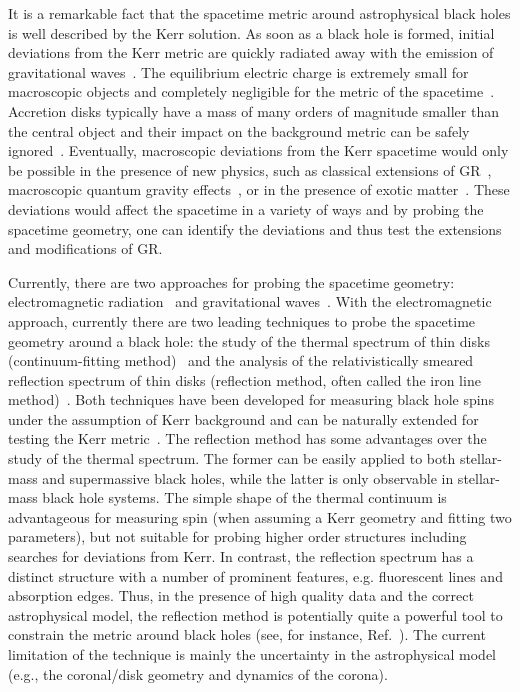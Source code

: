 \documentclass[11pt,a4paper,pdftex]{article}
\begin{document}
It is a remarkable fact that the spacetime metric around astrophysical black holes is well described by the Kerr solution. As soon as a black hole is formed, initial deviations from the Kerr metric are quickly radiated away with the emission of gravitational waves~\cite{price1,price2}. The equilibrium electric charge is extremely small for macroscopic objects and completely negligible for the metric of the spacetime~\cite{bambi2009black}. Accretion disks typically have a mass of many orders of magnitude smaller than the central object and their impact on the background metric can be safely ignored~\cite{barausse2014can,naokidisk}. Eventually, macroscopic deviations from the Kerr spacetime would only be possible in the presence of new physics, such as classical extensions of GR~\cite{extentions_GR}, macroscopic quantum gravity effects~\cite{dvali2013_quantum_effects2,dvali2013_quantum_effects1,giddings2014_quantum_effects}, or in the presence of exotic matter~\cite{herdeiro2015_exotic_field,herdeiro2016_exotic_field}. These deviations would affect the spacetime in a variety of ways and by probing the spacetime geometry, one can identify the deviations and thus test the extensions and modifications of GR.


Currently, there are two approaches for probing the spacetime geometry: electromagnetic radiation~\cite{em1,em2,em3} and gravitational waves~\cite{gw1,gw2}. With the electromagnetic approach, currently there are two leading techniques to probe the spacetime geometry around a black hole: the study of the thermal spectrum of thin disks (continuum-fitting method)~\cite{cfm1,cfm2,cfm3} and the analysis of the relativistically smeared reflection spectrum of thin disks (reflection method, often called the iron line method)~\cite{i1,i2,i3}. Both techniques have been developed for measuring black hole spins under the assumption of Kerr background and can be naturally extended for testing the Kerr metric~\cite{t1,t2,t3,t4,t5,t6,t7,t8}. The reflection method has some advantages over the study of the thermal spectrum. The former can be easily applied to both stellar-mass and supermassive black holes, while the latter is only observable in stellar-mass black hole systems. The simple shape of the thermal continuum is advantageous for measuring spin (when assuming a Kerr geometry and fitting two parameters), but not suitable for probing higher order structures including searches for deviations from Kerr. In contrast, the reflection spectrum has a distinct structure with a number of prominent features, e.g. fluorescent lines and absorption edges. Thus, in the presence of high quality data and the correct astrophysical model, the reflection method is potentially quite a powerful tool to constrain the metric around black holes (see, for instance, Ref.~\cite{jiachen}). The current limitation of the technique is mainly the uncertainty in the astrophysical model (e.g., the coronal/disk geometry and dynamics of the corona).
\end{document}
